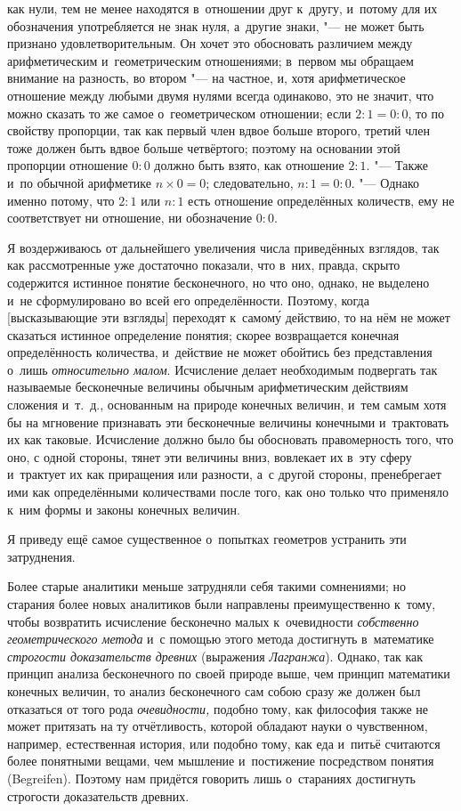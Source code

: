 как нули, тем не менее находятся в~отношении друг к~другу, и~потому для их
обозначения употребляется не знак нуля, а~другие знаки, "--- не может быть
признано удовлетворительным. Он хочет это обосновать различием между
арифметическим и~геометрическим отношениями; в~первом мы обращаем внимание на
разность, во втором "--- на частное, и, хотя арифметическое отношение между
любыми двумя нулями всегда одинаково, это не значит, что можно сказать то же
самое о~геометрическом отношении; если $2:1=0:0$, то по свойству
пропорции, так как первый член вдвое больше второго, третий член тоже должен
быть вдвое больше четвёртого; поэтому на основании этой пропорции отношение
$0:0$ должно быть взято, как отношение $2:1$. "--- Также и~по обычной
арифметике $n\times 0=0$; следовательно, $n:1=0:0$. "--- Однако именно
потому, что $2:1$ или $n:1$ есть отношение определённых количеств, ему не
соответствует ни отношение, ни обозначение $0:0$.

Я воздерживаюсь от дальнейшего увеличения числа приведённых взглядов, так как
рассмотренные уже достаточно показали, что в~них, правда, скрыто содержится
истинное понятие бесконечного, но что оно, однако, не выделено и~не
сформулировано во всей его определённости. Поэтому, когда [высказывающие эти
взгляды] переходят к~самом\'{у} действию, то на нём не может сказаться истинное
определение понятия; скорее возвращается конечная определённость
количества, и~действие не может обойтись без представления о~лишь
{\em относительно малом}. Исчисление делает необходимым подвергать так
называемые бесконечные величины обычным арифметическим действиям сложения
и~т.~д., основанным на природе конечных величин, и~тем самым хотя бы на
мгновение признавать эти бесконечные величины конечными и~трактовать их как
таковые. Исчисление должно было бы обосновать правомерность того, что оно, с
одной стороны, тянет эти величины вниз, вовлекает их в~эту сферу и~трактует их
как приращения или разности, а~с другой стороны, пренебрегает ими как
определёнными количествами после того, как оно только что применяло к~ним формы
и законы конечных величин.

Я приведу ещё самое существенное о~попытках геометров устранить эти
затруднения.

Более старые аналитики меньше затрудняли себя такими сомнениями; но старания
более новых аналитиков были направлены преимущественно к~тому, чтобы возвратить
исчисление бесконечно малых к~очевидности
{\em собственно геометрического метода} и~с помощью этого метода достигнуть
в~математике {\em строгости доказательств древних} (выражения {\em Лагранжа}).
Однако, так как принцип анализа бесконечного по своей природе выше, чем принцип
математики конечных величин, то анализ бесконечного сам собою сразу же должен
был отказаться от того рода {\em очевидности,} подобно тому, как философия
также не может притязать на ту отчётливость, которой обладают науки о
чувственном, например, естественная история, или подобно тому, как еда и~питьё
считаются более понятными вещами, чем мышление и~постижение посредством понятия
(Be\-grei\-fen). Поэтому нам придётся говорить лишь о~стараниях достигнуть
строгости доказательств древних.

